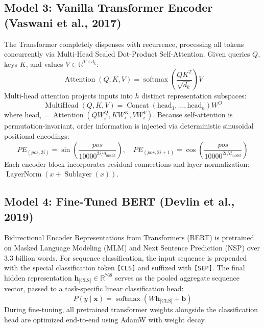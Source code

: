 \subsection{Model 3: Vanilla Transformer Encoder (Vaswani et al., 2017)}
The Transformer completely dispenses with recurrence, processing all tokens concurrently via Multi-Head Scaled Dot-Product Self-Attention. Given queries $Q$, keys $K$, and values $V \in \mathbb{R}^{T \times d_k}$:
\begin{equation}
    \operatorname{Attention}(Q, K, V) = \operatorname{softmax}\left( \frac{QK^T}{\sqrt{d_k}} \right) V
\end{equation}
Multi-head attention projects inputs into $h$ distinct representation subspaces:
\begin{equation}
    \operatorname{MultiHead}(Q, K, V) = \operatorname{Concat}(\text{head}_1, \dots, \text{head}_h) W^O
\end{equation}
where $\text{head}_i = \operatorname{Attention}(QW_i^Q, KW_i^K, VW_i^V)$. Because self-attention is permutation-invariant, order information is injected via deterministic sinusoidal positional encodings:
\begin{equation}
    PE_{(pos, 2i)} = \sin\left(\frac{pos}{10000^{2i/d_{\text{model}}}}\right), \quad PE_{(pos, 2i+1)} = \cos\left(\frac{pos}{10000^{2i/d_{\text{model}}}}\right)
\end{equation}
Each encoder block incorporates residual connections and layer normalization: $\operatorname{LayerNorm}(x + \operatorname{Sublayer}(x))$.

\subsection{Model 4: Fine-Tuned BERT (Devlin et al., 2019)}
Bidirectional Encoder Representations from Transformers (BERT) is pretrained on Masked Language Modeling (MLM) and Next Sentence Prediction (NSP) over 3.3 billion words. For sequence classification, the input sequence is prepended with the special classification token \texttt{[CLS]} and suffixed with \texttt{[SEP]}. The final hidden representation $\mathbf{h}_{\text{[CLS]}} \in \mathbb{R}^{768}$ serves as the pooled aggregate sequence vector, passed to a task-specific linear classification head:
\begin{equation}
    P(y \mid \mathbf{x}) = \operatorname{softmax}(W \mathbf{h}_{\text{[CLS]}} + \mathbf{b})
\end{equation}
During fine-tuning, all pretrained transformer weights alongside the classification head are optimized end-to-end using AdamW with weight decay.

